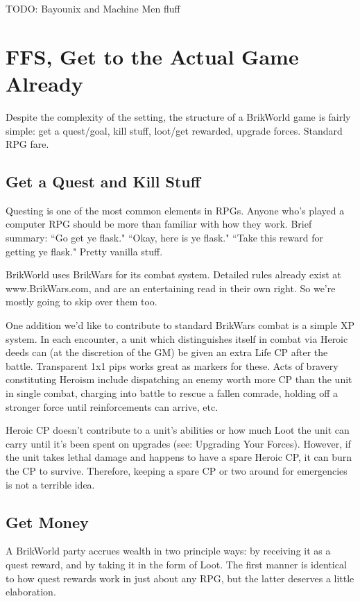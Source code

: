 \documentclass[12pt,a4paper,twocolumn]{article}
\begin{document}
TODO: Bayounix and Machine Men fluff

\section{FFS, Get to the Actual Game Already}

Despite the complexity of the setting, the structure of a BrikWorld game is fairly simple: get a quest/goal, kill stuff, loot/get rewarded, upgrade forces.  Standard RPG fare.

\subsection{Get a Quest and Kill Stuff}

Questing is one of the most common elements in RPGs. Anyone who's played a computer RPG should be more than familiar with how they work.  Brief summary: ``Go get ye flask." ``Okay, here is ye flask." ``Take this reward for getting ye flask."  Pretty vanilla stuff.  

BrikWorld uses BrikWars for its combat system.  Detailed rules already exist at www.BrikWars.com, and are an entertaining read in their own right.  So we're mostly going to skip over them too.  

One addition we'd like to contribute to standard BrikWars combat is a simple XP system.  In each encounter, a unit which distinguishes itself in combat via Heroic deeds can (at the discretion of the GM) be given an extra Life CP after the battle.  Transparent 1x1 pips works great as markers for these.  Acts of bravery constituting Heroism include dispatching an enemy worth more CP than the unit in single combat, charging into battle to rescue a fallen comrade, holding off a stronger force until reinforcements can arrive, etc.  

Heroic CP doesn't contribute to a unit's abilities or how much Loot the unit can carry until it's been spent on upgrades (see: Upgrading Your Forces).  However, if the unit takes lethal damage and happens to have a spare Heroic CP, it can burn the CP to survive.  Therefore, keeping a spare CP or two around for emergencies is not a terrible idea.

\subsection{Get Money}

A BrikWorld party accrues wealth in two principle ways: by receiving it as a quest reward, and by taking it in the form of Loot.  The first manner is identical to how quest rewards work in just about any RPG, but the latter deserves a little elaboration.
\end{document}
